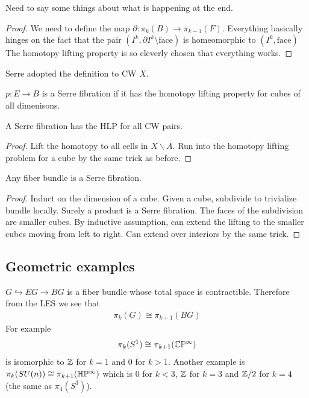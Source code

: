 \documentclass[12pt]{article}
\begin{document}
Need to say some things about what is happening at the end. 
\begin{proof}
    We need to define the map $\partial: \pi_k(B) \to \pi_{k-1}(F)$. Everything basically hinges on the fact that the pair $(I^k, \partial I^k \setminus \text{face})$ is homeomorphic to $(I^k, \text{face})$ The homotopy lifting property is so cleverly chosen that everything works.
\end{proof}
Serre adopted the definition to CW $X$.
\begin{definition}
    $p: E \to B$ is a Serre fibration if it has the homotopy lifting property for cubes of all dimenisons.
\end{definition}

\begin{theorem}
    A Serre fibration has the HLP for all CW pairs. 
\end{theorem}
\begin{proof}
    Lift the homotopy to all cells in $X \backslash A$. Run into the homotopy lifting problem for a cube by the same trick as before.
    \end{proof}

    \begin{theorem}
        Any fiber bundle is a Serre fibration.
    \end{theorem}

    \begin{proof}
        Induct on the dimension of a cube. Given a cube, subdivide to trivialize bundle locally. Surely a product is a Serre fibration. The faces of the subdivision are smaller cubes. By inductive assumption, can extend the lifting to the smaller cubes moving from left to right. Can extend over interiors by the same trick.
    \end{proof}

    \subsection{Geometric examples}

    \begin{example}
        $G \hookrightarrow EG \to BG$ is a fiber bundle whose total space is contractible. Therefore from the LES we see that \begin{align*}
            \pi_k(G) \cong \pi_{k+1}(BG)
        \end{align*}
        For example \begin{align*}
            \pi_k(S^1) \cong \pi_{k+1}(\mathbb{C}\mathbb{P}^\infty)
        \end{align*} is isomorphic to $\mathbb{Z}$ for $k=1$ and $0$ for $k>1$. Another example is $\pi_k(SU(n)) \cong \pi_{k+1}(\mathbb{H}\mathbb{P}^\infty)$ which is $0$ for $k<3$, $\mathbb{Z}$ for $k=3$ and $\mathbb{Z}/2$ for $k=4$ (the same as $\pi_4(S^3)$).
    \end{example}
\end{document}
